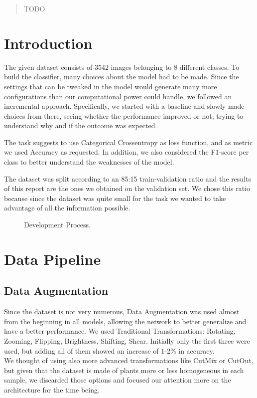 \documentclass[conference,compsoc,11pt]{IEEEtran}
\begin{document}
\maketitle

\begin{abstract}
TODO%
\end{abstract}
\IEEEpeerreviewmaketitle

\section{Introduction}
The given dataset consists of 3542 images belonging to 8 different classes. To build the classifier, many choices about the model had to be made. Since the settings that can be tweaked in the model would generate many more configurations than our computational power could handle, we followed an incremental approach. Specifically, we started with a baseline and slowly made choices from there, seeing whether the performance improved or not, trying to understand why and if the outcome was expected.

The task suggests to use Categorical Crossentropy as loss function, and as metric we used Accuracy as requested. In addition, we also considered the F1-score per class to better understand the weaknesses of the model.

The dataset was split according to an 85:15 train-validation ratio and the results of this report are the ones we obtained on the validation set. We chose this ratio because since the dataset was quite small for the task we wanted to take advantage of all the information possible.


\begin{figure}[h!]
\centering
\caption{Development Process.}
\label{fig_sim}
\end{figure}

\section{Data Pipeline}
\subsection{Data Augmentation}
Since the dataset is not very numerous, Data Augmentation was used almost from the beginning in all models, allowing the network to better generalize and have a better performance. We used Traditional Transformations: Rotating, Zooming, Flipping, Brightness, Shifting, Shear.
Initially only the first three were used, but adding all of them showed an increase of 1-2\% in accuracy.\\
We thought of using also more advanced transformations like CutMix or CutOut, but given that the dataset is made of plants more or less homogeneous in each sample, we discarded those options and focused our attention more on the architecture for the time being.
\end{document}
